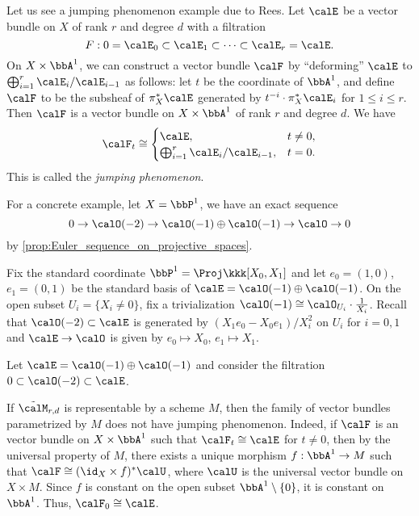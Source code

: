     \begin{example}\label{eg:Rees_construction}
        Let us see a jumping phenomenon example due to Rees.
        Let \(\calE\) be a vector bundle on \(X\) of rank \(r\) and degree \(d\) with a filtration
        \[F: 0 = \calE_0 \subset \calE_1 \subset \cdots \subset \calE_r = \calE. \]
        On \(X \times \bbA^1\), we can construct a vector bundle \(\calF\) by ``deforming'' \(\calE\) to \(\bigoplus_{i=1}^r \calE_i/\calE_{i-1}\) as follows:
        let \(t\) be the coordinate of \(\bbA^1\), 
        and define \(\calF\) to be the subsheaf of \(\pi_X^* \calE\) generated by \(t^{-i} \cdot \pi_X^* \calE_i\) for \(1 \leq i \leq r\).
        Then \(\calF\) is a vector bundle on \(X \times \bbA^1\) of rank \(r\) and degree \(d\).
        We have 
        \[ \calF_t \cong \begin{cases}
            \calE, & t \neq 0, \\
            \bigoplus_{i=1}^r \calE_i/\calE_{i-1}, & t = 0.
        \end{cases} \]
        This is called the \emph{jumping phenomenon}.

        For a concrete example, let \(X = \bbP^1\), we have an exact sequence
        \[ 0 \to \calO(-2) \to \calO(-1) \oplus \calO(-1) \to \calO \to 0 \]
        by \cref{prop:Euler_sequence_on_projective_spaces}.

        Fix the standard coordinate \(\bbP^1 = \Proj \kkk[X_0,X_1]\) and let \(e_0 = (1,0)\), \(e_1 = (0,1)\) be the standard basis of \(\calE = \calO(-1) \oplus \calO(-1)\).
        On the open subset \(U_i = \{X_i \neq 0\}\), fix a trivialization \(\calO(-1) \cong \calO_{U_i} \cdot \frac{1}{X_i}\).
        Recall that \(\calO(-2) \subset \calE\) is generated by \((X_1 e_0 - X_0 e_1)/X_i^2\) on \(U_i\) for \(i = 0,1\) and \(\calE \to \calO\) is given by \(e_0 \mapsto X_0\), \(e_1 \mapsto X_1\).

        Let \(\calE = \calO(-1) \oplus \calO(-1)\) and consider the filtration \(0 \subset \calO(-2) \subset \calE\).
    \end{example}

    If \(\tilde{\calM}_{r,d}\) is representable by a scheme \(M\), then the family of vector bundles parametrized by \(M\) does not have jumping phenomenon.
    Indeed, if \(\calF\) is an vector bundle on \(X \times \bbA^1\) such that \(\calF_t \cong \calE\) for \(t \neq 0\), 
    then by the universal property of \(M\), there exists a unique morphism \(f : \bbA^1 \to M\) such that \(\calF \cong (\id_X \times f)^* \calU\), 
    where \(\calU\) is the universal vector bundle on \(X \times M\).
    Since \(f\) is constant on the open subset \(\bbA^1 \setminus \{0\}\), it is constant on \(\bbA^1\).
    Thus, \(\calF_0 \cong \calE\).


